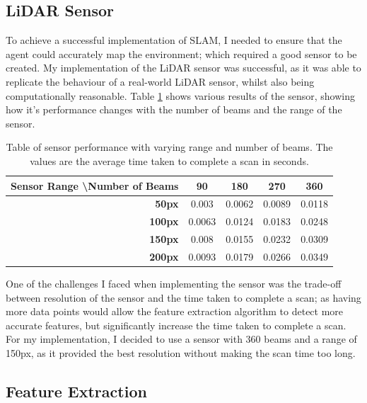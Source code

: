 \documentclass[12pt]{article}
\begin{document}
\subsection{LiDAR Sensor}
To achieve a successful implementation of SLAM, I needed to ensure that the agent could accurately map the environment; which
required a good sensor to be created. My implementation of the LiDAR sensor was successful, as it was able to replicate the
behaviour of a real-world LiDAR sensor, whilst also being computationally reasonable. Table \ref{results_tab} shows various
results of the sensor, showing how it's performance changes with the number of beams and the range of the sensor. \\
\begin{table}[H]
    \centering
    \begin{tabular}{|r|c|c|c|c|}
        \hline
        \textbf{Sensor Range \textbackslash Number of Beams} &
        \textbf{90}&
        \textbf{180} &
        \textbf{270} &
        \textbf{360} \\
        \hline
        \textbf{50px} &
        0.003 &
        0.0062 &
        0.0089 &
        0.0118 \\
        \hline
        \textbf{100px} &
        0.0063 &
        0.0124 &
        0.0183 &
        0.0248 \\
        \hline
        \textbf{150px} &
        0.008 &
        0.0155 &
        0.0232 &
        0.0309 \\
        \hline
        \textbf{200px} &
        0.0093 &
        0.0179 &
        0.0266 &
        0.0349 \\
        \hline
    \end{tabular}
    \caption{Table of sensor performance with varying range and number of beams. The values are the average time taken
    to complete a scan in seconds.}
    \label{results_tab}
\end{table}
One of the challenges I faced when implementing the sensor was the trade-off between resolution of the sensor and the
time taken to complete a scan; as having more data points would allow the feature extraction algorithm to detect more
accurate features, but significantly increase the time taken to complete a scan. For my implementation, I decided to use
a sensor with 360 beams and a range of 150px, as it provided the best resolution without making the scan time too long.\\

\subsection{Feature Extraction}
\end{document}

